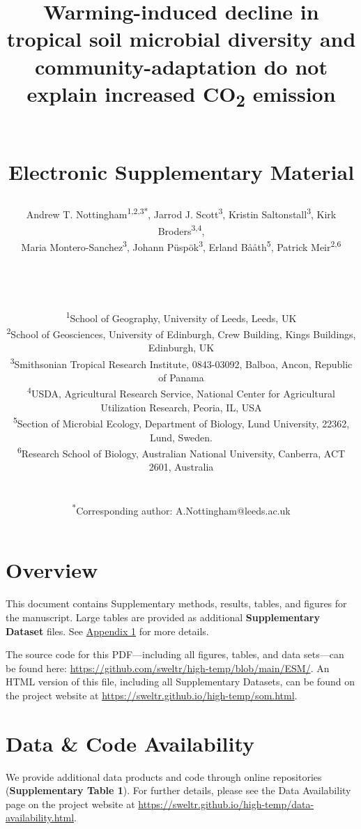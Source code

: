 \documentclass[
  10pt,
  letterpaper,
  DIV=11,
  numbers=noendperiod]{scrartcl}
\date{}
\title{\LARGE Warming-induced decline in tropical soil microbial
diversity and community-adaptation do not explain increased
CO\textsubscript{2} emission\\
\strut \\
Electronic Supplementary Material}
\author{Andrew T. Nottingham\textsuperscript{1,2,3*}, Jarrod J.
Scott\textsuperscript{3}, Kristin Saltonstall\textsuperscript{3}, Kirk
Broders\textsuperscript{3,4},\\
Maria Montero-Sanchez\textsuperscript{3}, Johann
Püspök\textsuperscript{3}, Erland Bååth\textsuperscript{5}, Patrick
Meir\textsuperscript{2,6}\\
\strut \\
\strut \\
\RaggedRight \small \textsuperscript{1}School of Geography, University
of Leeds, Leeds, UK\\
\small \textsuperscript{2}School of Geosciences, University of
Edinburgh, Crew Building, Kings Buildings, Edinburgh, UK\\
\small \textsuperscript{3}Smithsonian Tropical Research Institute,
0843-03092, Balboa, Ancon, Republic of Panama\\
\small \textsuperscript{4}USDA, Agricultural Research Service, National
Center for Agricultural Utilization Research, Peoria, IL, USA\\
\small \textsuperscript{5}Section of Microbial Ecology, Department of
Biology, Lund University, 22362, Lund, Sweden.\\
\small \textsuperscript{6}Research School of Biology, Australian
National University, Canberra, ACT 2601, Australia\\
\strut \\
\small \textsuperscript{*}Corresponding author:
A.Nottingham@leeds.ac.uk}
\date{}
\renewcommand*\contentsname{Table of contents}
\newcommand\contentsname{Table of contents}
\begin{document}
\maketitle
\ifdefined\Shaded\renewenvironment{Shaded}{\begin{tcolorbox}[breakable, interior hidden, sharp corners, frame hidden, enhanced, borderline west={3pt}{0pt}{shadecolor}, boxrule=0pt]}{\end{tcolorbox}}\fi

\renewcommand*\contentsname{Contents}
{
\hypersetup{linkcolor=}
\setcounter{tocdepth}{2}
\tableofcontents
}
\listoffigures
\listoftables
\hypertarget{overview}{%
\section{Overview}\label{overview}}

This document contains Supplementary methods, results, tables, and
figures for the manuscript. Large tables are provided as additional
\textbf{Supplementary Dataset} files. See
\hyperref[appendix-1]{\color{blue}Appendix 1} for more details.

\begin{tcolorbox}[enhanced jigsaw, colback=white, toprule=.15mm, colframe=quarto-callout-note-color-frame, rightrule=.15mm, opacityback=0, breakable, bottomrule=.15mm, arc=.35mm, left=2mm, leftrule=.75mm]
The source code for this PDF---including all figures, tables, and data
sets---can be found here:
\url{https://github.com/sweltr/high-temp/blob/main/ESM/}. An HTML
version of this file, including all Supplementary Datasets, can be found
on the project website at
\url{https://sweltr.github.io/high-temp/som.html}.
\end{tcolorbox}

\hypertarget{data-code-availability}{%
\section{Data \& Code Availability}\label{data-code-availability}}

We provide additional data products and code through online repositories
(\textbf{Supplementary Table 1}). For further details, please see the
Data Availability page on the project website at
\url{https://sweltr.github.io/high-temp/data-availability.html}.
\end{document}
